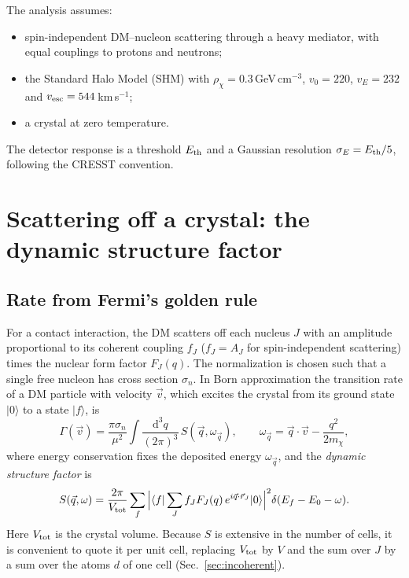 \documentclass[11pt,a4paper]{article}
\numberwithin{equation}{section}
\newcommand{\qv}{\vec q}
\newcommand{\ket}[1]{|#1\rangle}
\newcommand{\bra}[1]{\langle #1|}
\newcommand{\dd}{\mathrm{d}}
\newcommand{\Eth}{E_{\rm th}}
\newcommand{\mchi}{m_\chi}
\begin{document}
The analysis assumes:
\begin{itemize}
  \item spin-independent DM--nucleon scattering through a heavy mediator, with equal couplings
  to protons and neutrons;
  \item the Standard Halo Model (SHM) with $\rho_\chi=0.3$\,GeV\,cm$^{-3}$,
  $v_0=220$, $v_E=232$ and $v_{\rm esc}=544$\,km\,s$^{-1}$;
  \item a crystal at zero temperature.
\end{itemize}
The detector response is a threshold $\Eth$ and a Gaussian resolution $\sigma_E=\Eth/5$,
following the CRESST convention.

\section{Scattering off a crystal: the dynamic structure factor}
\label{sec:S}
\subsection{Rate from Fermi's golden rule}
For a contact interaction, the DM scatters off each nucleus $J$ with an amplitude proportional to its coherent coupling $f_J$ ($f_J=A_J$ for spin-independent scattering) times the nuclear form factor $F_J(q)$. The normalization is chosen such that a single free nucleon has cross section $\sigma_n$. In Born
approximation the transition rate of a DM particle with velocity $\vec v$, which excites the
crystal from its ground state $\ket0$ to a state $\ket f$, is
\begin{equation}
  \Gamma(\vec v) = \frac{\pi\sigma_n}{\mu^2}\int\!\frac{\dd^3q}{(2\pi)^3}\,
  S(\qv,\omega_{\qv}), \qquad
  \omega_{\qv} = \qv\cdot\vec v - \frac{q^2}{2\mchi},
  \label{eq:Gamma}
\end{equation}
where energy conservation fixes the deposited energy $\omega_{\qv}$, and the
\emph{dynamic structure factor} is
\begin{equation}
  S(\qv,\omega) = \frac{2\pi}{V_{\rm tot}}\sum_f
  \Big|\bra f \sum_J f_J F_J(q)\, e^{i\qv\cdot\vec r_J}\ket0\Big|^2
  \delta(E_f-E_0-\omega).
  \label{eq:Sdef}
\end{equation}
Here $V_{\rm tot}$ is the crystal volume. Because $S$ is extensive in the number of cells, it
is convenient to quote it per unit cell, replacing $V_{\rm tot}$ by $V$ and the sum over $J$
by a sum over the atoms $d$ of one cell (Sec.~\ref{sec:incoherent}).
\end{document}
